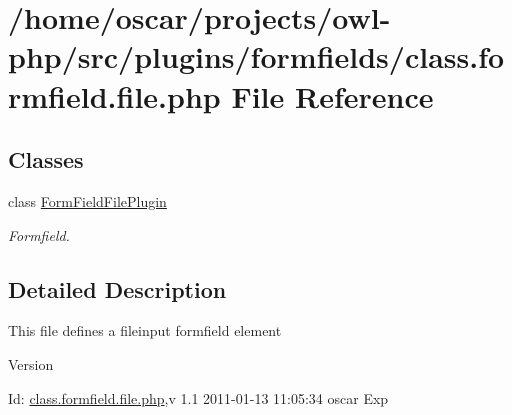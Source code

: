 \section{/home/oscar/projects/owl-\/php/src/plugins/formfields/class.formfield.file.php File Reference}
\label{class_8formfield_8file_8php}
\subsection*{Classes}
\begin{DoxyCompactItemize}
\item 
class \hyperlink{classFormFieldFilePlugin}{FormFieldFilePlugin}
\begin{DoxyCompactList}\small\item\em Formfield. \item\end{DoxyCompactList}\end{DoxyCompactItemize}


\subsection{Detailed Description}
This file defines a fileinput formfield element \begin{DoxyVersion}{Version}

\end{DoxyVersion}
\begin{DoxyParagraph}{Id:}
\hyperlink{class_8formfield_8file_8php}{class.formfield.file.php},v 1.1 2011-\/01-\/13 11:05:34 oscar Exp 
\end{DoxyParagraph}
